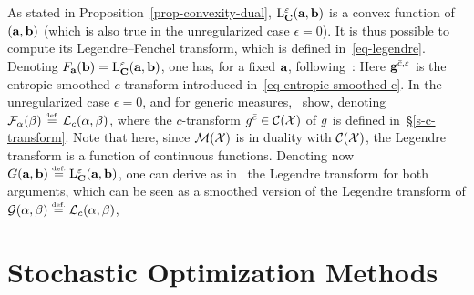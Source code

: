 \begin{rem} 
	As stated in Proposition~\ref{prop-convexity-dual}, $\mathrm{L}_{\mathrm{\textbf{C}}}^\varepsilon(\mathrm{\textbf{a}},\mathrm{\textbf{b}})$ is a convex function of $(\mathrm{\textbf{a}},\mathrm{\textbf{b}})$ (which is also true in the unregularized case $\epsilon=0$). 
	It is thus possible to compute its Legendre--Fenchel transform, which is defined in~\eqref{eq-legendre}.
	Denoting $F_{\mathrm{\textbf{a}}}(\mathrm{\textbf{b}}) = \mathrm{L}_{\mathrm{\textbf{C}}}^\varepsilon(\mathrm{\textbf{a}},\mathrm{\textbf{b}})$, one has, for a fixed $\mathrm{\textbf{a}}$, following~\citet{2016-Cuturi-siims}:
	Here $\mathrm{\textbf{g}}^{\bar{c},\varepsilon}$ is the entropic-smoothed $c$-transform introduced in~\eqref{eq-entropic-smoothed-c}.
	In the unregularized case $\epsilon=0$, and for generic measures,~\citet{Carlier-NumericsBarycenters} show, 	
	denoting $\Ff_\al(\be) \eqdef \MK_\c(\al,\be)$,
	where the $\bar c$-transform $g^{\bar c} \in \mathcal{C}(\mathcal{X})$ of $g$ is defined in~\S\ref{s-c-transform}.
	Note that here, since $\mathcal{M}(\mathcal{X})$ is in duality with $\mathcal{C}(\mathcal{X})$, the Legendre transform is a function of continuous functions.
	Denoting now $G(\a,\b) \eqdef \MKD_\C^\epsilon(\a,\b)$, one can derive as in~\citep{2016-Cuturi-siims,cuturi2018semidual} the Legendre transform for both arguments,
	which can be seen as a smoothed version of the Legendre transform of $\Gg(\al,\be) \eqdef \MK_\c(\al,\be)$,
\end{rem}



\section{Stochastic Optimization Methods}
\label{sec-sgd}

